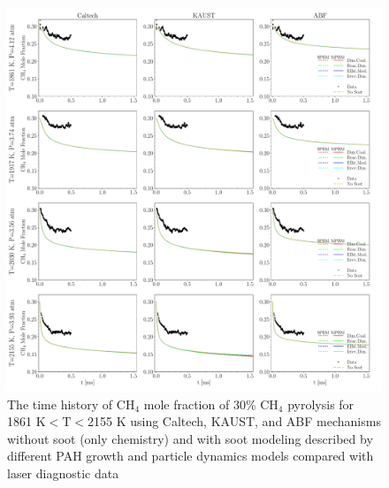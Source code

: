 \begin{figure}[H]
	\centering
	\includegraphics[width=1\textwidth]{Figures/Results/Shocktube/Stanford/june/30CH4_CH4_mechs_s0.pdf}
	\caption{The time history of $\mathrm{CH_4}$ mole fraction of 30\% $\mathrm{CH_4}$ pyrolysis for 1861 K$<\mathrm{T}<$2155 K using Caltech, KAUST, and ABF mechanisms without soot (only chemistry) and with soot modeling described by different PAH growth and particle dynamics models compared with laser diagnostic data}
	\label{fig:shocktubest_30ch4_ch4_0} 
\end{figure}


